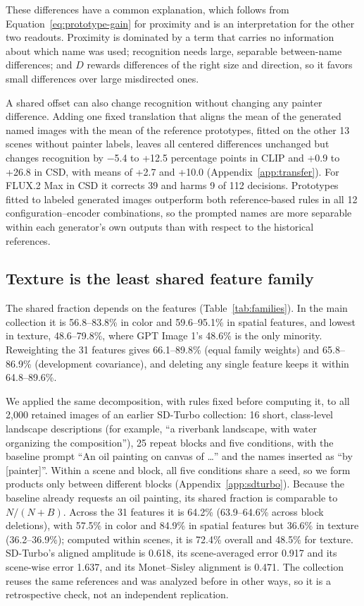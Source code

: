\documentclass[10pt]{article}
\begin{document}
These differences have a common explanation, which follows from Equation~\ref{eq:prototype-gain}
for proximity and is an interpretation for the other two readouts. Proximity is dominated by a
term that carries no information about which name was used; recognition needs large,
separable between-name differences; and $D$ rewards differences of the right size and
direction, so it favors small differences over large misdirected ones.

A shared offset can also change recognition without changing any painter difference. Adding
one fixed translation that aligns the mean of the generated named images with the mean of the
reference prototypes, fitted on the other 13 scenes without painter labels, leaves all centered
differences unchanged but changes recognition by $-$5.4 to +12.5 percentage points in CLIP and
+0.9 to +26.8 in CSD, with means of +2.7 and +10.0 (Appendix~\ref{app:transfer}). For FLUX.2
Max in CSD it corrects 39 and harms 9 of 112 decisions. Prototypes fitted to labeled generated
images outperform both reference-based rules in all 12 configuration--encoder combinations,
so the prompted names are more separable within each generator's own outputs than with respect
to the historical references.

\subsection{Texture is the least shared feature family}\label{sec:families}



The shared fraction depends on the features (Table~\ref{tab:families}). In the main
collection it is 56.8--83.8\% in color and 59.6--95.1\% in spatial features, and lowest in
texture, 48.6--79.8\%, where GPT Image 1's 48.6\% is the only minority. Reweighting the 31
features gives 66.1--89.8\% (equal family weights) and 65.8--86.9\% (development covariance),
and deleting any single feature keeps it within 64.8--89.6\%.

We applied the same decomposition, with rules fixed before computing it, to all 2,000 retained
images of an earlier SD-Turbo collection: 16 short, class-level landscape descriptions (for
example, ``a riverbank landscape, with water organizing the composition''), 25 repeat blocks
and five conditions, with the baseline prompt ``An oil painting on canvas of \ldots'' and the
names inserted as ``by [painter]''. Within a scene and block, all five conditions share a
seed, so we form products only between different blocks (Appendix~\ref{app:sdturbo}). Because
the baseline already requests an oil painting, its shared fraction is comparable to
$N/(N+B)$. Across the 31 features it is 64.2\% (63.9--64.6\% across block deletions), with
57.5\% in color and 84.9\% in spatial features but 36.6\% in texture (36.2--36.9\%); computed
within scenes, it is 72.4\% overall and 48.5\% for texture. SD-Turbo's aligned amplitude is
0.618, its scene-averaged error 0.917 and its scene-wise error 1.637, and its Monet--Sisley
alignment is 0.471. The collection reuses the same references and was analyzed before in
other ways, so it is a retrospective check, not an independent replication.
\end{document}
